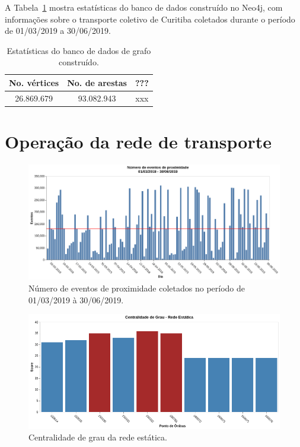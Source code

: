 A Tabela~\ref{tab:neo} mostra estatísticas do banco de dados construído no Neo4j, com informações sobre o transporte coletivo de Curitiba coletados durante o período de 01/03/2019 a 30/06/2019.

\begin{table}[h]
    \caption{Estatísticas do banco de dados de grafo construído.}
    \label{tab:neo}
    \centering
    \begin{tabular}{ccc} 
        \hline
        No. vértices & No. de arestas & ???\\
        \hline
        26.869.679 & 93.082.943 & xxx \\
        \hline  
    \end{tabular}
\end{table}



\section{Operação da rede de transporte}


\begin{figure}
\centering
\includegraphics[width=.9\textwidth]{Capitulo4/img/eventos_proximidade.png}
\caption{Número de eventos de proximidade coletados no período de 01/03/2019 à 30/06/2019.}
\label{fig:eventos-de-proximidade}
\end{figure}



\begin{figure}
\centering
\includegraphics[width=.9\textwidth]{Capitulo4/img/centralidade-grau.png}
\caption{Centralidade de grau da rede estática.}
\label{fig:eventos-de-proximidade}
\end{figure}

